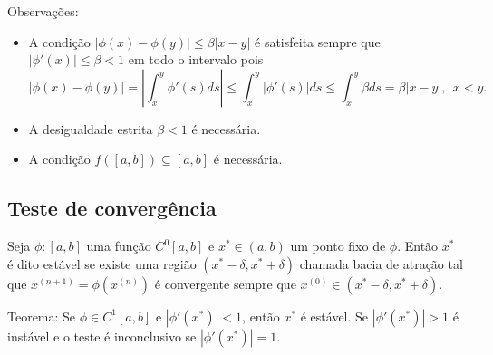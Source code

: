 Observações:
\begin{itemize}
\item A condição $|\phi(x)-\phi(y)|\leq \beta |x-y|$ é satisfeita sempre que $|\phi'(x)|\leq \beta<1$ em todo o intervalo pois
$$|\phi(x)-\phi(y)|=\left|\int_x^y\phi'(s)ds\right|\leq \int_x^y|\phi'(s)|ds\leq \int_x^y\beta ds=\beta|x-y|,~~ x<y.$$

\item A desigualdade estrita $\beta<1$ é necessária.

\item A condição $f([a,b])\subseteq [a,b]$ é necessária.

\end{itemize}


\subsection{Teste de convergência}
Seja $\phi :[a,b]$ uma função $C^0[a,b]$ e $x^*\in(a,b)$ um ponto fixo de $\phi$. Então $x^*$ é dito estável se existe uma região $(x^*-\delta,x^*+\delta)$ chamada bacia de atração tal que $x^{(n+1)}=\phi(x^{(n)})$ é convergente sempre que $x^{(0)}\in(x^*-\delta,x^*+\delta)$.

Teorema: Se $\phi\in C^1[a,b]$ e  $|\phi'(x^*)|<1$, então $x^*$ é estável. Se $|\phi'(x^*)|>1$ é instável e o teste é inconclusivo se $|\phi'(x^*)|=1$.


